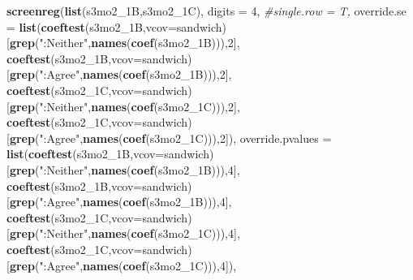 \documentclass[
]{article}
\newenvironment{Shaded}{\begin{snugshade}}{\end{snugshade}}
\newcommand{\CommentTok}[1]{\textcolor[rgb]{0.56,0.35,0.01}{\textit{#1}}}
\newcommand{\DataTypeTok}[1]{\textcolor[rgb]{0.13,0.29,0.53}{#1}}
\newcommand{\DecValTok}[1]{\textcolor[rgb]{0.00,0.00,0.81}{#1}}
\newcommand{\KeywordTok}[1]{\textcolor[rgb]{0.13,0.29,0.53}{\textbf{#1}}}
\newcommand{\NormalTok}[1]{#1}
\newcommand{\StringTok}[1]{\textcolor[rgb]{0.31,0.60,0.02}{#1}}
\begin{document}
\begin{Shaded}
\begin{Highlighting}[]
\KeywordTok{screenreg}\NormalTok{(}\KeywordTok{list}\NormalTok{(s3mo2_1B,s3mo2_1C), }\DataTypeTok{digits =} \DecValTok{4}\NormalTok{, }\CommentTok{#single.row = T,}
          \DataTypeTok{override.se =} \KeywordTok{list}\NormalTok{(}\KeywordTok{coeftest}\NormalTok{(s3mo2_1B,}\DataTypeTok{vcov=}\NormalTok{sandwich)[}\KeywordTok{grep}\NormalTok{(}\StringTok{":Neither"}\NormalTok{,}\KeywordTok{names}\NormalTok{(}\KeywordTok{coef}\NormalTok{(s3mo2_1B))),}\DecValTok{2}\NormalTok{],}
                             \KeywordTok{coeftest}\NormalTok{(s3mo2_1B,}\DataTypeTok{vcov=}\NormalTok{sandwich)[}\KeywordTok{grep}\NormalTok{(}\StringTok{":Agree"}\NormalTok{,}\KeywordTok{names}\NormalTok{(}\KeywordTok{coef}\NormalTok{(s3mo2_1B))),}\DecValTok{2}\NormalTok{],}
                             \KeywordTok{coeftest}\NormalTok{(s3mo2_1C,}\DataTypeTok{vcov=}\NormalTok{sandwich)[}\KeywordTok{grep}\NormalTok{(}\StringTok{":Neither"}\NormalTok{,}\KeywordTok{names}\NormalTok{(}\KeywordTok{coef}\NormalTok{(s3mo2_1C))),}\DecValTok{2}\NormalTok{],}
                             \KeywordTok{coeftest}\NormalTok{(s3mo2_1C,}\DataTypeTok{vcov=}\NormalTok{sandwich)[}\KeywordTok{grep}\NormalTok{(}\StringTok{":Agree"}\NormalTok{,}\KeywordTok{names}\NormalTok{(}\KeywordTok{coef}\NormalTok{(s3mo2_1C))),}\DecValTok{2}\NormalTok{]),}
          \DataTypeTok{override.pvalues =} \KeywordTok{list}\NormalTok{(}\KeywordTok{coeftest}\NormalTok{(s3mo2_1B,}\DataTypeTok{vcov=}\NormalTok{sandwich)[}\KeywordTok{grep}\NormalTok{(}\StringTok{":Neither"}\NormalTok{,}\KeywordTok{names}\NormalTok{(}\KeywordTok{coef}\NormalTok{(s3mo2_1B))),}\DecValTok{4}\NormalTok{],}
                                  \KeywordTok{coeftest}\NormalTok{(s3mo2_1B,}\DataTypeTok{vcov=}\NormalTok{sandwich)[}\KeywordTok{grep}\NormalTok{(}\StringTok{":Agree"}\NormalTok{,}\KeywordTok{names}\NormalTok{(}\KeywordTok{coef}\NormalTok{(s3mo2_1B))),}\DecValTok{4}\NormalTok{],}
                                  \KeywordTok{coeftest}\NormalTok{(s3mo2_1C,}\DataTypeTok{vcov=}\NormalTok{sandwich)[}\KeywordTok{grep}\NormalTok{(}\StringTok{":Neither"}\NormalTok{,}\KeywordTok{names}\NormalTok{(}\KeywordTok{coef}\NormalTok{(s3mo2_1C))),}\DecValTok{4}\NormalTok{],}
                                  \KeywordTok{coeftest}\NormalTok{(s3mo2_1C,}\DataTypeTok{vcov=}\NormalTok{sandwich)[}\KeywordTok{grep}\NormalTok{(}\StringTok{":Agree"}\NormalTok{,}\KeywordTok{names}\NormalTok{(}\KeywordTok{coef}\NormalTok{(s3mo2_1C))),}\DecValTok{4}\NormalTok{]),}

\end{Highlighting}
\end{Shaded}
\end{document}
